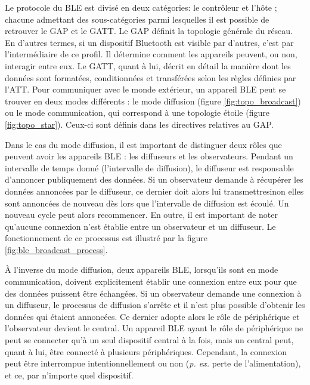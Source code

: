 Le protocole du \acs{BLE} est divisé en deux catégories: le contrôleur et l'hôte ; chacune admettant des sous-catégories parmi lesquelles il est possible de retrouver le \ac{GAP} et le \ac{GATT}. Le \acs{GAP} définit la topologie générale du réseau. En d'autres termes, si un dispositif Bluetooth est visible par d'autres, c'est par l'intermédiaire de ce profil. Il détermine comment les appareils peuvent, ou non, interagir entre eux. Le \acs{GATT}, quant à lui, décrit en détail la manière dont les données sont formatées, conditionnées et transférées selon les règles définies par l'\ac{ATT}. Pour communiquer avec le monde extérieur, un appareil \acs{BLE} peut se trouver en deux modes différents : le mode diffusion (figure \ref{fig:topo_broadcast}) ou le mode communication, qui correspond à une topologie étoile (figure \ref{fig:topo_star}). Ceux-ci sont définis dans les directives relatives au \acs{GAP}.

Dans le cas du mode diffusion, il est important de distinguer deux rôles que peuvent avoir les appareils \acs{BLE} : les diffuseurs et les observateurs. Pendant un intervalle de temps donné (l'intervalle de diffusion), le diffuseur est responsable d'annoncer publiquement des données. Si un observateur demande à récupérer les données annoncées par le diffuseur, ce dernier doit alors lui transmettre\textemdash sinon elles sont annoncées de nouveau dès lors que l'intervalle de diffusion est écoulé. Un nouveau cycle peut alors recommencer. En outre, il est important de noter qu'aucune connexion n'est établie entre un observateur et un diffuseur. Le fonctionnement de ce processus est illustré par la figure \ref{fig:ble_broadcast_process}.

À l'inverse du mode diffusion, deux appareils \acs{BLE}, lorsqu'ils sont en mode communication, doivent explicitement établir une connexion entre eux pour que des données puissent être échangées. Si un observateur demande une connexion à un diffuseur, le processus de diffusion s'arrête et il n'est plus possible d'obtenir les données qui étaient annoncées. Ce dernier adopte alors le rôle de périphérique et l'observateur devient le central. Un appareil \acs{BLE} ayant le rôle de périphérique ne peut se connecter qu'à un seul dispositif central à la fois, mais un central peut, quant à lui, être connecté à plusieurs périphériques. Cependant, la connexion peut être interrompue intentionnellement ou non (\textit{p. ex.} perte de l'alimentation), et ce, par n'importe quel dispositif.

